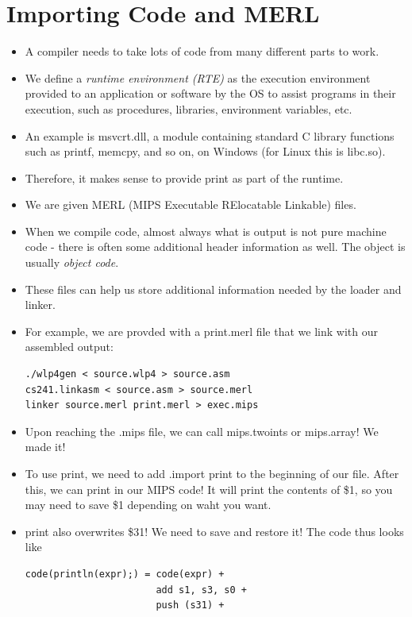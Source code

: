 \documentclass[12pt]{article}
\begin{document}
\section{Importing Code and MERL}
\begin{itemize}
    \item A compiler needs to take lots of code from many different parts to work.
    \item We define a \emph{runtime environment (RTE)} as the execution environment provided to an application or software by the OS to assist programs in their execution, such as procedures, libraries, environment variables, etc.
    \item An example is msvcrt.dll, a module containing standard C library functions such as printf, memcpy, and so on, on Windows (for Linux this is libc.so).
    \item Therefore, it makes sense to provide print as part of the runtime.
    \item We are given MERL (MIPS Executable RElocatable Linkable) files.
    \item When we compile code, almost always what is output is not pure machine code - there is often some additional header information as well.  The object is usually \emph{object code}.
    \item These files can help us store additional information needed by the loader and linker.
    \item For example, we are provded with a print.merl file that we link with our assembled output:
\begin{lstlisting}[mathescape, numbers=none, breaklines=true]
./wlp4gen < source.wlp4 > source.asm
cs241.linkasm < source.asm > source.merl
linker source.merl print.merl > exec.mips
\end{lstlisting}
    \item Upon reaching the .mips file, we can call mips.twoints or mips.array!  We made it!
    \item To use print, we need to add .import print to the beginning of our file.  After this, we can print in our MIPS code!  It will print the contents of \$1, so you may need to save \$1 depending on waht you want.
    \item print also overwrites \$31!  We need to save and restore it!  The code thus looks like
\begin{lstlisting}[mathescape, numbers=none, breaklines=true]
code(println(expr);) = code(expr) + 
                       add s1, s3, s0 +
                       push (s31) +

\end{lstlisting}
\end{itemize}
\end{document}
